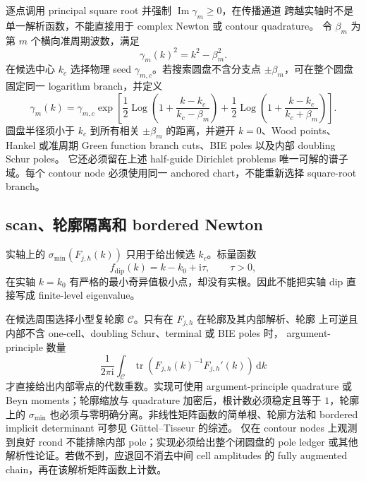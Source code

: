 \documentclass[UTF8,fontset=fandol,11pt,a4paper]{ctexart}
\begin{document}
逐点调用 principal square root 并强制 $\operatorname{Im}\gamma_m\ge0$，在传播通道
跨越实轴时不是单一解析函数，不能直接用于 complex Newton 或 contour quadrature。
令 $\beta_m$ 为第 $m$ 个横向准周期波数，满足
\[
  \gamma_m(k)^2=k^2-\beta_m^2.
\]
在候选中心 $k_c$ 选择物理 seed $\gamma_{m,c}$。若搜索圆盘不含分支点
$\pm\beta_m$，可在整个圆盘固定同一 logarithm branch，并定义
\[
  \gamma_m(k)=\gamma_{m,c}
  \exp\!\left[
    \frac12\operatorname{Log}\!\left(1+\frac{k-k_c}{k_c-\beta_m}\right)
    +\frac12\operatorname{Log}\!\left(1+\frac{k-k_c}{k_c+\beta_m}\right)
  \right].
\]
圆盘半径须小于 $k_c$ 到所有相关 $\pm\beta_m$ 的距离，并避开 $k=0$、Wood points、
Hankel 或准周期 Green function branch cuts、BIE poles 以及内部 doubling Schur poles。
它还必须留在上述 half-guide Dirichlet problems 唯一可解的谱子域。每个 contour node
必须使用同一 anchored chart，不能重新选择 square-root branch。

\subsection{scan、轮廓隔离和 bordered Newton}

实轴上的 $\sigma_{\min}(F_{j,h}(k))$ 只用于给出候选 $k_c$。标量函数
\[
  f_{\mathrm{dip}}(k)=k-k_0+\mathrm{i}\tau,
  \qquad \tau>0,
\]
在实轴 $k=k_0$ 有严格的最小奇异值极小点，却没有实根。因此不能把实轴 dip 直接写成
finite-level eigenvalue。

在候选周围选择小型复轮廓 $\mathcal C$。只有在 $F_{j,h}$ 在轮廓及其内部解析、轮廓
上可逆且内部不含 one-cell、doubling Schur、terminal 或 BIE poles 时，
argument-principle 数量
\[
  \frac{1}{2\pi\mathrm{i}}
  \int_{\mathcal C}
  \operatorname{tr}\!\left(F_{j,h}(k)^{-1}F_{j,h}'(k)\right)
  \,\mathrm{d}k
\]
才直接给出内部零点的代数重数。实现可使用 argument-principle quadrature 或 Beyn
moments；轮廓缩放与 quadrature 加密后，根计数必须稳定且等于 $1$，轮廓上的
$\sigma_{\min}$ 也必须与零明确分离。非线性矩阵函数的简单根、轮廓方法和 bordered
implicit determinant 可参见 Güttel--Tisseur 的综述\cite{GuettelTisseur2017}。
仅在 contour nodes 上观测到良好 rcond 不能排除内部 pole；实现必须给出整个闭圆盘的
pole ledger 或其他解析性论证。若做不到，应退回不消去中间 cell amplitudes 的 fully
augmented chain，再在该解析矩阵函数上计数。
\end{document}
